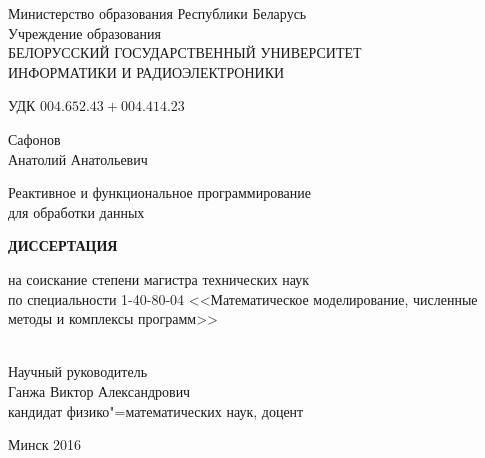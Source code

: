 \begin{titlepage}
  \begin{center}
    Министерство образования Республики Беларусь\\[1em]
    Учреждение образования\\
    БЕЛОРУССКИЙ ГОСУДАРСТВЕННЫЙ УНИВЕРСИТЕТ \\
    ИНФОРМАТИКИ И РАДИОЭЛЕКТРОНИКИ\\[2em]

    \begin{flushleft}
        УДК $004.652.43+004.414.23$\\[2cm]
    \end{flushleft}

    \begin{center}
      Сафонов \\ Анатолий Анатольевич\\[3em]
    \end{center}

    {\centering Реактивное и функциональное программирование \\ для обработки данных \\[3em]}


    {\centering\textbf{ДИССЕРТАЦИЯ}}\\[2em]

    \begin{center}
      на соискание степени магистра технических наук \\ по специальности 1-40-80-04 <<Математическое моделирование, численные методы и комплексы программ>>\\[3em]
    \end{center}

    \begin{flushright}
      \underline{\hspace*{7.5cm}} \\[1cm]
      Научный руководитель \\
      Ганжа Виктор Александрович \\
      кандидат физико"=математических наук, доцент \\[1cm]
      \underline{\hspace*{7.5cm}}
    \end{flushright}

    \vfill
    {\normalsize Минск 2016}
  \end{center}
\end{titlepage}
